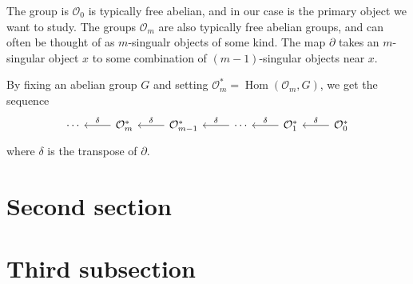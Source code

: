 The group is \(\mathcal{O}_{0}\) is typically free abelian, and in our case is the primary object we want to study. The groups \(\mathcal{O}_{m}\) are also typically free abelian groups, and can often be thought of as \(m\)-singualr objects of some kind. The map \(\partial\) takes an \(m\)-singular object \(x\) to some combination of \((m - 1)\)-singular objects near \(x\).

By fixing an abelian group \(G\) and setting \(\mathcal{O}_{m}^{\ast} = \operatorname{Hom}(\mathcal{O}_{m}, G)\), we get the sequence
\[\begin{tikzcd}
	\cdots & {\mathcal{O}_{m}^{\ast}} & {\mathcal{O}_{m - 1}^{\ast}} & \cdots & {\mathcal{O}_{1}^{\ast}} & {\mathcal{O}_{0}^{\ast}}
	\arrow["\delta"', from=1-2, to=1-1]
	\arrow["\delta"', from=1-3, to=1-2]
	\arrow["\delta"', from=1-4, to=1-3]
	\arrow["\delta"', from=1-5, to=1-4]
	\arrow["\delta"', from=1-6, to=1-5]
\end{tikzcd}\]
where \(\delta\) is the transpose of \(\partial\).



\section{Second section}

\section{Third subsection}
